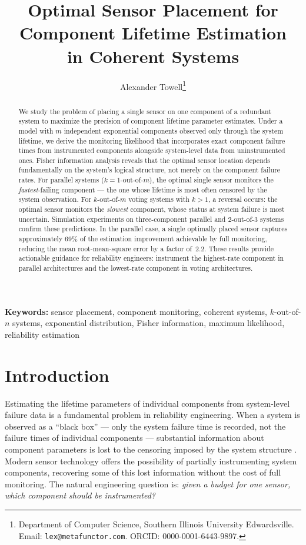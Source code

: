 \documentclass[12pt]{article}
\title{Optimal Sensor Placement for Component Lifetime Estimation\\
in Coherent Systems}
\author{Alexander Towell\thanks{Department of Computer Science,
  Southern Illinois University Edwardsville.
  Email: \texttt{lex@metafunctor.com}.
  ORCID: 0000-0001-6443-9897.}}
\date{}
\theoremstyle{definition}
\theoremstyle{remark}
\begin{document}
\maketitle

\begin{abstract}
We study the problem of placing a single sensor on one component of a
redundant system to maximize the precision of component lifetime
parameter estimates.  Under a model with $m$ independent exponential
components observed only through the system lifetime, we derive the
monitoring likelihood that incorporates exact component failure times
from instrumented components alongside system-level data from
uninstrumented ones.  Fisher information analysis reveals that the
optimal sensor location depends fundamentally on the system's logical
structure, not merely on the component failure rates.  For parallel
systems ($k = 1$-out-of-$m$), the optimal single sensor monitors the
\emph{fastest}-failing component --- the one whose lifetime is most
often censored by the system observation.  For $k$-out-of-$m$ voting
systems with $k > 1$, a reversal occurs: the optimal sensor monitors
the \emph{slowest} component, whose status at system failure is most
uncertain.  Simulation experiments on three-component parallel and
$2$-out-of-$3$ systems confirm these predictions.  In the parallel
case, a single optimally placed sensor captures approximately 69\% of
the estimation improvement achievable by full monitoring, reducing the
mean root-mean-square error by a factor of~$2.2$.  These results
provide actionable guidance for reliability engineers: instrument the
highest-rate component in parallel architectures and the lowest-rate
component in voting architectures.
\end{abstract}

\noindent\textbf{Keywords:} sensor placement, component monitoring,
coherent systems, $k$-out-of-$n$ systems, exponential distribution,
Fisher information, maximum likelihood, reliability estimation

\section{Introduction}
\label{sec:intro}

Estimating the lifetime parameters of individual components from
system-level failure data is a fundamental problem in reliability
engineering.  When a system is observed as a ``black box'' --- only the
system failure time is recorded, not the failure times of individual
components --- substantial information about component parameters is
lost to the censoring imposed by the system structure
\citep{BhattacharyaSamaniego2010, Towell2026}.  Modern sensor
technology offers the possibility of partially instrumenting system
components, recovering some of this lost information without the cost
of full monitoring.  The natural engineering question is: \emph{given a
budget for one sensor, which component should be instrumented?}
\end{document}
